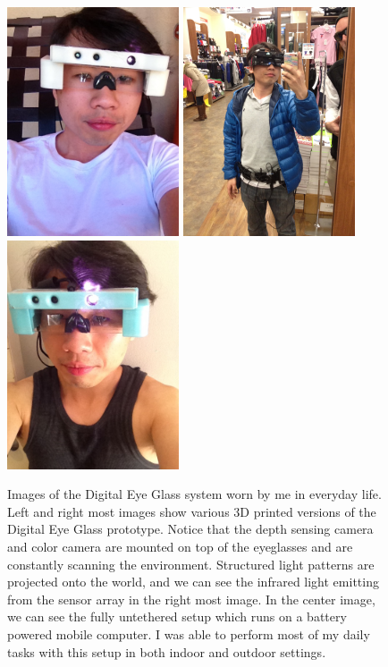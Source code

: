 \begin{figure}
\center
\includegraphics[width=2in]{ch7/figures/left_white.jpg}
\includegraphics[width=2in]{ch7/figures/wearable.jpg}
\includegraphics[width=2in]{ch7/figures/right_blue.jpg}

 \caption{Images of the Digital Eye Glass system worn by me in everyday life. Left and right most images show various 3D printed versions of the Digital Eye Glass prototype. Notice that the depth sensing camera and color camera are mounted on top of the eyeglasses and are constantly scanning the environment. Structured light patterns are projected onto the world, and we can see the infrared light emitting from the sensor array in the right most image. In the center image, we can see the fully untethered setup which runs on a battery powered mobile computer. I was able to perform most of my daily tasks with this setup in both indoor and outdoor settings.}
 \label{fig:prototypes}
\end{figure}



